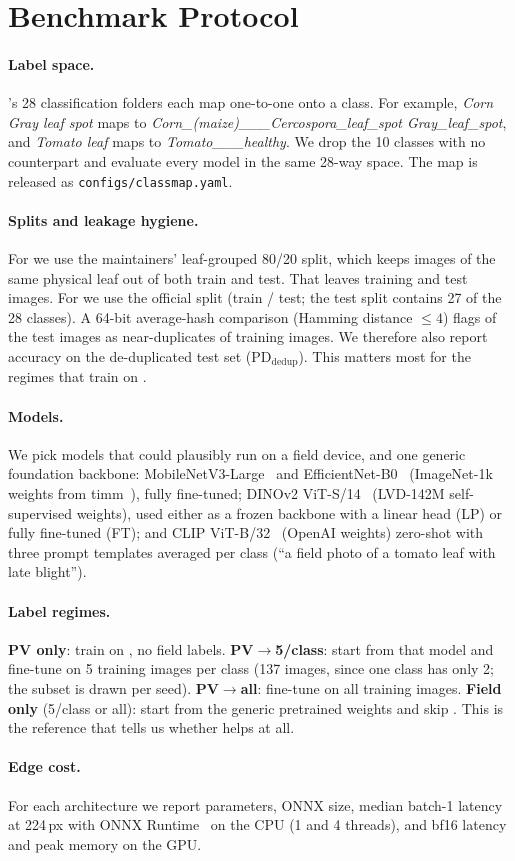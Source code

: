 \section{Benchmark Protocol}
\label{sec:method}

\paragraph{Label space.}
\PD's 28 classification folders each map one-to-one onto a \PV class. For example, \emph{Corn Gray leaf spot} maps to \emph{Corn\_(maize)\_\_\_Cercospora\_leaf\_spot Gray\_leaf\_spot}, and \emph{Tomato leaf} maps to \emph{Tomato\_\_\_healthy}. We drop the 10 \PV classes with no \PD counterpart and evaluate every model in the same 28-way space. The map is released as \texttt{configs/classmap.yaml}.

\paragraph{Splits and leakage hygiene.}
For \PV we use the maintainers' leaf-grouped 80/20 split, which keeps images of the same physical leaf out of both train and test. That leaves \PVtrainN training and \PVtestN test images. For \PD we use the official split (\PDtrainN train / \PDtestN test; the test split contains 27 of the 28 classes).
A 64-bit average-hash comparison (Hamming distance $\le 4$) flags \PDdups of the \PDtestN \PD test images as near-duplicates of \PD training images. We therefore also report accuracy on the de-duplicated test set (PD$_\text{dedup}$). This matters most for the regimes that train on \PD.

\paragraph{Models.}
We pick models that could plausibly run on a field device, and one generic foundation backbone:
MobileNetV3-Large~\cite{howard2019searching} and EfficientNet-B0~\cite{tan2019efficientnet} (ImageNet-1k weights from timm~\cite{wightman2019timm}), fully fine-tuned;
DINOv2 ViT-S/14~\cite{oquab2023dinov} (LVD-142M self-supervised weights), used either as a frozen backbone with a linear head (LP) or fully fine-tuned (FT);
and CLIP ViT-B/32~\cite{radford2021learning} (OpenAI weights) zero-shot with three prompt templates averaged per class (\eg ``a field photo of a tomato leaf with late blight'').

\paragraph{Label regimes.}
\textbf{PV only}: train on \PV, no field labels.
\textbf{PV$\rightarrow$5/class}: start from that model and fine-tune on 5 \PD training images per class (137 images, since one class has only 2; the subset is drawn per seed).
\textbf{PV$\rightarrow$all}: fine-tune on all \PD training images.
\textbf{Field only} (5/class or all): start from the generic pretrained weights and skip \PV. This is the reference that tells us whether \PV helps at all.

\paragraph{Edge cost.}
For each architecture we report parameters, ONNX size, median batch-1 latency at 224\,px with ONNX Runtime~\cite{onnxruntime} on the CPU (1 and 4 threads), and bf16 latency and peak memory on the GPU.
